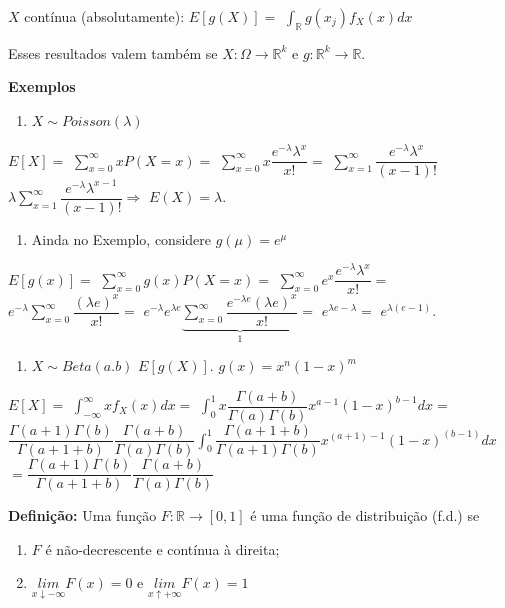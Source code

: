 \documentclass[
]{book}
\providecommand{\tightlist}{%
  \setlength{\itemsep}{0pt}\setlength{\parskip}{0pt}}
\begin{document}
\(X\) contínua (absolutamente): \(E[g(X)] =\) \(\int_{\mathbb{R}} g(x_j)f_X(x)dx\)

Esses resultados valem também se \(X: \Omega \longrightarrow \mathbb{R}^k\) e \(g: \mathbb{R}^k\longrightarrow \mathbb{R}.\)

\textbf{Exemplos}

\begin{enumerate}
\def\labelenumi{\arabic{enumi}.}
\tightlist
\item
  \(X \sim Poisson(\lambda)\)
\end{enumerate}

\(E[X] =\) \(\sum_{x=0}^\infty xP(X=x)=\) \(\sum_{x=0}^\infty x\dfrac{e^{-\lambda}\lambda^x}{x!}=\) \(\sum_{x=1}^\infty \dfrac{e^{-\lambda}\lambda^x}{(x-1)!}\) \(\lambda \sum_{x=1}^\infty \dfrac{e^{-\lambda}\lambda^{x-1}}{(x-1)!} \Rightarrow\) \(E(X) = \lambda.\)

\begin{enumerate}
\def\labelenumi{\arabic{enumi}.}
\setcounter{enumi}{1}
\tightlist
\item
  Ainda no Exemplo, considere \(g(\mu) = e^\mu\)
\end{enumerate}

\(E[g(x)]=\) \(\sum_{x=0}^\infty g(x)P(X=x)=\) \(\sum_{x=0}^\infty e^x \dfrac{e^{-\lambda}\lambda^x}{x!}=\) \(e^{-\lambda}\sum_{x=0}^\infty \dfrac{(\lambda e)^x}{x!}=\) \(e^{-\lambda}e^{\lambda e}\underbrace{\sum_{x=0}^{\infty} \dfrac{e^{-\lambda e}(\lambda e)^x}{x!}}_{1}=\) \(e^{\lambda e - \lambda}=\) \(e^{\lambda(e-1)}\).

\begin{enumerate}
\def\labelenumi{\arabic{enumi}.}
\setcounter{enumi}{2}
\tightlist
\item
  \(X \sim Beta(a.b)\) \(E[g(X)]\). \(g(x) = x^n(1-x)^m\)
\end{enumerate}

\(E[X] =\) \(\int_{-\infty}^\infty xf_X(x)dx=\) \(\int_0^1 x \dfrac{\Gamma(a+b)}{\Gamma(a)\Gamma(b)}x^{a-1}(1-x)^{b-1}dx=\) \(\dfrac{\Gamma (a+1)\Gamma(b)}{\Gamma(a+1+b)}\dfrac{\Gamma(a+b)}{\Gamma(a)\Gamma(b)}\int_0^1\dfrac{\Gamma(a+1+b)}{\Gamma(a+1)\Gamma(b)}x^{(a+1)-1}(1-x)^(b-1)dx\) \(=\dfrac{\Gamma (a+1)\Gamma(b)}{\Gamma(a+1+b)}\dfrac{\Gamma(a+b)}{\Gamma(a)\Gamma(b)}\)

\textbf{Definição:} Uma função \(F: \mathbb{R} \longrightarrow [0,1]\) é uma função de distribuição (f.d.) se

\begin{enumerate}
\def\labelenumi{(\roman{enumi})}
\tightlist
\item
  \(F\) é não-decrescente e contínua à direita;
\item
  \(\underset{x\downarrow-\infty}{lim}F(x)=0\) e \(\underset{x\uparrow+\infty}{lim}F(x)=1\)
\end{enumerate}
\end{document}

